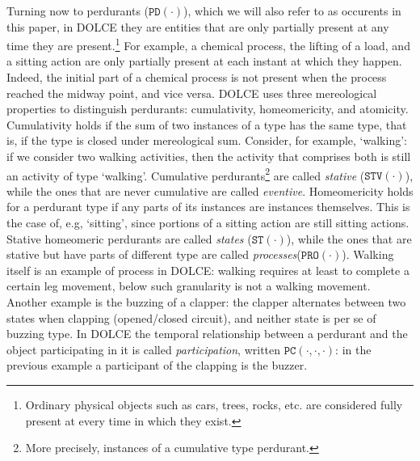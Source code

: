 \documentclass[sw]{iosart2x}
\newcommand{\generalStyle}[1]{\texttt{#1}}
\newcommand{\uniRel}[2]{\generalStyle{#1}(#2)}
\newcommand{\triRel}[4]{\generalStyle{#1}(#2,#3,#4)}
\newcommand{\DOLCE}{\textsc{DOLCE}\xspace} %
\newcommand{\DOLCEState}[1]{\uniRel{{ST}}{#1}}
\newcommand{\DOLCEProcess}[1]{\uniRel{PRO}{#1}}
\newcommand{\DOLCEPerdurant}[1]{\uniRel{{PD}}{#1}}
\newcommand{\DOLCEStative}[1]{\uniRel{{STV}}{#1}}
\newcommand{\DOLCEPC}[3]{\triRel{{PC}}{#1}{#2}{#3}}
\newcommand{\firstTimeKeyWord}[1]{\textit{#1}}
\newcommand{\quotes}[1]{`#1'}
\begin{document}
Turning now to perdurants ($\DOLCEPerdurant{\cdot}$), which we will also refer to as occurents in this paper, in \DOLCE they are entities that are only partially present at any time they are present.\footnote{Ordinary physical objects such as cars, trees, rocks, etc. are considered fully present at every time in which they exist.} For example, a chemical process, the lifting of a load, and a sitting action are only partially present at each instant at which they happen. Indeed, the initial part of a chemical process is not present when the process reached the midway point, and vice versa.  %
\DOLCE uses three mereological properties to distinguish perdurants: cumulativity, homeomericity, and atomicity.
Cumulativity holds if the sum of two instances of a type has the same type, that is, if the type is closed under mereological sum. Consider, for example, \quotes{walking}: if we consider two walking activities, then the activity that comprises both is still an activity of type \quotes{walking}.
Cumulative perdurants\footnote{More precisely, instances of a cumulative type perdurant.} are called \firstTimeKeyWord{stative} ($\DOLCEStative{\cdot}$), while the ones that are never cumulative are called \firstTimeKeyWord{eventive}.
Homeomericity holds for a perdurant type if any parts of its instances are instances themselves.
This is the case of, e.g, \quotes{sitting}, since portions of a sitting action are still sitting actions.
Stative homeomeric perdurants are called \firstTimeKeyWord{states} ($\DOLCEState{\cdot}$), while the ones that are stative but have parts of different type are called \firstTimeKeyWord{processes}($\DOLCEProcess{\cdot}$). Walking itself is an example of process in \DOLCE: walking requires at least to complete a certain leg movement, below such granularity is not a walking movement.
Another example is the buzzing of a clapper: the clapper alternates between two states when clapping (opened/closed circuit), and neither state is per se of buzzing type. In \DOLCE the temporal relationship between a perdurant and the object participating in it is called \firstTimeKeyWord{participation}, written $\DOLCEPC{\cdot}{\cdot}{\cdot}$: in the previous example a participant of the clapping is the buzzer.
\end{document}

